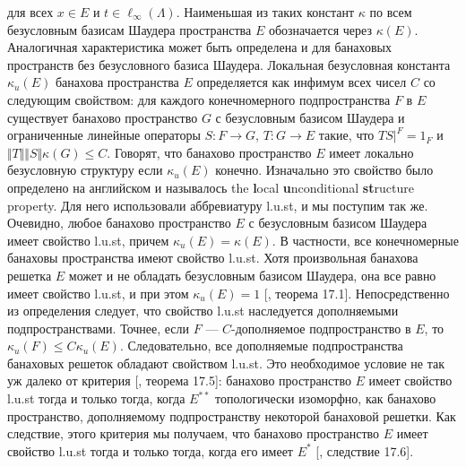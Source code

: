 для всех $x\in E$ и $t\in\ell_\infty(\Lambda)$. Наименьшая из таких констант $\kappa$ по всем безусловным базисам Шаудера пространства $E$ обозначается через $\kappa(E)$. Аналогичная характеристика может быть определена и для банаховых пространств без безусловного базиса Шаудера. Локальная безусловная константа $\kappa_u(E)$ банахова пространства $E$ определяется как инфимум всех чисел $C$ со следующим свойством: для каждого конечномерного подпространства $F$ в $E$ существует банахово пространство $G$ с безусловным базисом Шаудера и ограниченные линейные операторы $S:F\to G$, $T:G\to E$ такие, что $TS|^{F}=1_F$ и $\Vert T\Vert\Vert S\Vert\kappa(G)\leq C$. Говорят, что банахово пространство $E$ имеет локально безусловную структуру если $\kappa_u(E)$ конечно. Изначально это свойство было определено на английском и называлось the \textbf{l}ocal \textbf{u}nconditional \textbf{st}ructure property. Для него использовали аббревиатуру l.u.st, и мы поступим так же. Очевидно, любое банахово пространство $E$ с безусловным базисом Шаудера имеет свойство l.u.st, причем $\kappa_u(E)=\kappa(E)$. В частности, все конечномерные банаховы пространства имеют свойство l.u.st. Хотя произвольная банахова решетка $E$ может и не обладать безусловным базисом Шаудера, она все равно имеет свойство l.u.st, и при этом $\kappa_u(E)=1$  [\cite{DiestAbsSumOps}, теорема 17.1]. Непосредственно из определения следует, что свойство l.u.st наследуется дополняемыми подпространствами. Точнее, если $F$ --- $C$-дополняемое подпространство в $E$, то $\kappa_u(F)\leq C\kappa_u(E)$. Следовательно, все дополняемые подпространства банаховых решеток обладают свойством l.u.st. Это необходимое условие не так уж далеко от критерия [\cite{DiestAbsSumOps}, теорема 17.5]: банахово пространство $E$ имеет свойство l.u.st тогда и только тогда, когда $E^{**}$ топологически изоморфно, как банахово пространство, дополняемому подпространству некоторой банаховой решетки. Как следствие, этого критерия мы получаем, что банахово пространство $E$ имеет свойство l.u.st тогда и только тогда, когда его имеет $E^*$ [\cite{DiestAbsSumOps}, следствие 17.6].

